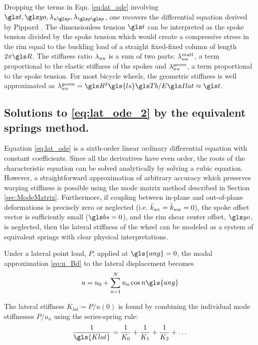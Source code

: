 \documentclass[\rootdir/thesis.tex]{subfiles}
\begin{document}
Dropping the terms in Eqn. \eqref{eq:lat_ode} involving $\ts, \yo, \lr_{u\p}, \lr_{\p\p}$, one recovers the differential equation derived by Pippard \cite{Pippard1932a}. The dimensionless tension $\ts$ can be interpreted as the spoke tension divided by the spoke tension which would create a compressive stress in the rim equal to the buckling load of a straight fixed-fixed column of length $2\pi \R$. The stiffness ratio $\lambda_{uu}$ is a sum of two parts: $\lambda_{uu}^{matl}$, a term proportional to the elastic stiffness of the spokes and $\lambda_{uu}^{geom}$, a term proportional to the spoke tension. For most bicycle wheels, the geometric stiffness is well approximated as $\geom{\lr_{uu}} = \R^2\gls{ls}\Tb/\EIl \approx \ts$.

\subsection{Solutions to \eqref{eq:lat_ode_2} by the equivalent springs method.}
\label{sec:equiv_springs}

Equation \eqref{eq:lat_ode} is a sixth-order linear ordinary differential equation with constant coefficients. Since all the derivatives have even order, the roots of the characteristic equation can be solved analytically by solving a cubic equation. However, a straightforward approximation of arbitrary accuracy which preserves warping stiffness is possible using the mode matrix method described in Section \ref{sec:ModeMatrix}. Furthermore, if coupling between in-plane and out-of-plane deformations is precisely zero or neglected (i.e. $\bar{k}_{uv} = \bar{k}_{uw} = 0$), the spoke offset vector is sufficiently small ($\bs=0$), and the rim shear center offset, $\yo$, is neglected, then the lateral stiffness of the wheel can be modeled as a system of equivalent springs with clear physical interpretations.

Under a lateral point load, $P$, applied at $\gls{ang}=0$, the modal approximation \eqref{eq:u_Bd} to the lateral displacement becomes
\begin{equation}
\label{eq:u_kequiv}
u = u_0 + \sum_{n=1}^N u_n \cos{n\gls{ang}}
\end{equation}

The lateral stiffness $K_{lat}=P/u(0)$ is found by combining the individual mode stiffnesses $P/u_n$ using the series-spring rule:
\begin{equation}
\label{eq:Klat_series}
\frac{1}{\gls{Klat}} = \frac{1}{K_0} + \frac{1}{K_1} + \frac{1}{K_2} + \dots
\end{equation}
\end{document}
